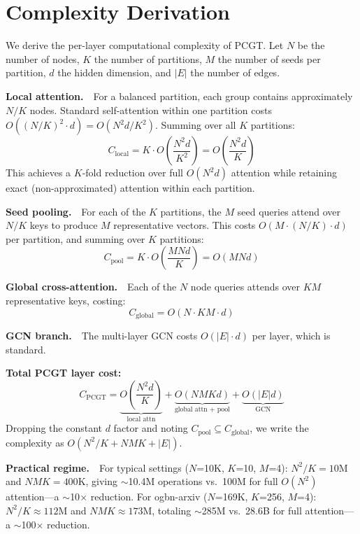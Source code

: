 \section{Complexity Derivation}
\label{app:complexity}

We derive the per-layer computational complexity of PCGT. Let $N$ be the number of nodes, $K$ the number of partitions, $M$ the number of seeds per partition, $d$ the hidden dimension, and $|E|$ the number of edges.

\textbf{Local attention.}~~For a balanced partition, each group contains approximately $N/K$ nodes. Standard self-attention within one partition costs $O((N/K)^2 \cdot d) = O(N^2 d / K^2)$. Summing over all $K$ partitions:
\begin{equation}
C_\text{local} = K \cdot O\!\left(\frac{N^2 d}{K^2}\right) = O\!\left(\frac{N^2 d}{K}\right)
\label{eq:local_cost}
\end{equation}
This achieves a $K$-fold reduction over full $O(N^2 d)$ attention while retaining exact (non-approximated) attention within each partition.

\textbf{Seed pooling.}~~For each of the $K$ partitions, the $M$ seed queries attend over $N/K$ keys to produce $M$ representative vectors. This costs $O(M \cdot (N/K) \cdot d)$ per partition, and summing over $K$ partitions:
\begin{equation}
C_\text{pool} = K \cdot O\!\left(\frac{MNd}{K}\right) = O(MNd)
\label{eq:pool_cost}
\end{equation}

\textbf{Global cross-attention.}~~Each of the $N$ node queries attends over $KM$ representative keys, costing:
\begin{equation}
C_\text{global} = O(N \cdot KM \cdot d)
\label{eq:global_cost}
\end{equation}

\textbf{GCN branch.}~~The multi-layer GCN costs $O(|E| \cdot d)$ per layer, which is standard.

\textbf{Total PCGT layer cost:}
\begin{equation}
C_\text{PCGT} = \underbrace{O\!\left(\frac{N^2 d}{K}\right)}_{\text{local attn}} + \underbrace{O(NMKd)}_{\text{global attn + pool}} + \underbrace{O(|E|d)}_{\text{GCN}} 
\label{eq:total_cost}
\end{equation}
Dropping the constant $d$ factor and noting $C_\text{pool} \subseteq C_\text{global}$, we write the complexity as $O(N^2/K + NMK + |E|)$.

\textbf{Practical regime.}~~For typical settings ($N$=10K, $K$=10, $M$=4): $N^2/K = 10$M and $NMK = 400$K, giving $\sim$10.4M operations vs.\ 100M for full $O(N^2)$ attention---a $\sim$10$\times$ reduction. For ogbn-arxiv ($N$=169K, $K$=256, $M$=4): $N^2/K \approx 112$M and $NMK \approx 173$M, totaling $\sim$285M vs.\ 28.6B for full attention---a $\sim$100$\times$ reduction.

